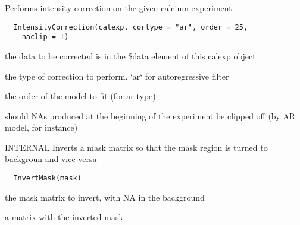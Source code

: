 \documentclass[a4paper]{book}
\begin{document}
%
\begin{Description}\relax
Performs intensity correction on the given calcium
experiment
\end{Description}
%
\begin{Usage}
\begin{verbatim}
  IntensityCorrection(calexp, cortype = "ar", order = 25,
    naclip = T)
\end{verbatim}
\end{Usage}
%
\begin{Arguments}
\begin{ldescription}
\item[\code{calexp}] the data to be corrected is in the \$data
element of this calexp object

\item[\code{cortype}] the type of correction to perform.  `ar`
for autoregressive filter

\item[\code{order}] the order of the model to fit (for ar type)

\item[\code{naclip}] should NAs produced at the beginning of the
experiment be clipped off (by AR model, for instance)
\end{ldescription}
\end{Arguments}
%
\begin{Description}\relax
INTERNAL Inverts a mask matrix so that the mask region is
turned to backgroun and vice versa
\end{Description}
%
\begin{Usage}
\begin{verbatim}
  InvertMask(mask)
\end{verbatim}
\end{Usage}
%
\begin{Arguments}
\begin{ldescription}
\item[\code{mask}] the mask matrix to invert, with NA in the
background
\end{ldescription}
\end{Arguments}
%
\begin{Value}
a matrix with the inverted mask
\end{Value}
\end{document}
